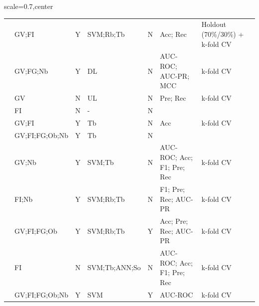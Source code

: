 \begin{landscape}
\begin{table}[!th]
\begin{adjustbox}{scale=0.7,center}
\begin{tabular}{llclcll}
\citet{Nicora2019}       & GV;FI          & Y                                    & SVM;Rb;Tb       & N                                     & Acc; Rec                     & Holdout (70\%/30\%) + k-fold CV \\
\citet{Schulte-Sasse2019} & GV;FG;Nb       & Y                                    & DL              & N                                     & AUC-ROC; AUC-PR; MCC                   & k-fold CV                       \\
\citet{Xi2019}            & GV             & N                                    & UL              & N                                     & Pre; Rec               & k-fold CV                       \\
\citet{Zhu2019}           & FI             & N                                    & -         & N                                     &                                 &                                 \\
\citet{Chandrashekar2020} & GV;FI             & Y                                    & Tb              & N                                     & Acc                             & k-fold CV                       \\
\citet{Colaprico2020}     & GV;FI;FG;Ob;Nb       & Y                                    & Tb              & N                                     &                                 &                                 \\
\citet{Cutigi2020}        & GV;Nb          & Y                                    & SVM;Tb          & N                                     & AUC-ROC; Acc; F1; Pre; Rec & k-fold CV                       \\
\citet{Gumpinger2020}     & FI;Nb             & Y                                    & SVM;Rb;Tb       & N                                     & F1; Pre; Rec; AUC-PR  & k-fold CV                       \\
\citet{Lyu2020}           & GV;FI;FG;Ob    & Y                                    & SVM;Rb;Tb       & Y                                     & Acc; Pre; Rec; AUC-PR & k-fold CV                       \\
\citet{Wang2020}           & FI    & N                                    & SVM;Tb;ANN;So       & N                                     & AUC-ROC; Acc; F1; Pre; Rec & k-fold CV                       \\
\citet{Nulsen2021}        & GV;FI;FG;Ob;Nb & Y                                    & SVM             & Y                                     & AUC-ROC                             & k-fold CV                       \\ \hline


\end{tabular}
\end{adjustbox}
\end{table}
\end{landscape}
